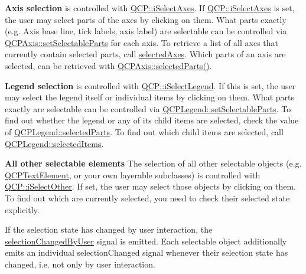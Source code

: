 {\bfseries{Axis selection}} is controlled with \mbox{\hyperlink{namespace_q_c_p_a2ad6bb6281c7c2d593d4277b44c2b037ad6644ac55bef621645326e9dd7469caa}{Q\+C\+P\+::i\+Select\+Axes}}. If \mbox{\hyperlink{namespace_q_c_p_a2ad6bb6281c7c2d593d4277b44c2b037ad6644ac55bef621645326e9dd7469caa}{Q\+C\+P\+::i\+Select\+Axes}} is set, the user may select parts of the axes by clicking on them. What parts exactly (e.\+g. Axis base line, tick labels, axis label) are selectable can be controlled via \mbox{\hyperlink{class_q_c_p_axis_a513f9b9e326c505d9bec54880031b085}{Q\+C\+P\+Axis\+::set\+Selectable\+Parts}} for each axis. To retrieve a list of all axes that currently contain selected parts, call \mbox{\hyperlink{class_q_custom_plot_a7e6b07792b1cb2c31681596582d14dbe}{selected\+Axes}}. Which parts of an axis are selected, can be retrieved with \mbox{\hyperlink{class_q_c_p_axis_a893e8d6cfed9267eb2b793cb1d2b4dce}{Q\+C\+P\+Axis\+::selected\+Parts()}}.

{\bfseries{Legend selection}} is controlled with \mbox{\hyperlink{namespace_q_c_p_a2ad6bb6281c7c2d593d4277b44c2b037a269c9af298e257d1108edec0432b5513}{Q\+C\+P\+::i\+Select\+Legend}}. If this is set, the user may select the legend itself or individual items by clicking on them. What parts exactly are selectable can be controlled via \mbox{\hyperlink{class_q_c_p_legend_a9ce60aa8bbd89f62ae4fa83ac6c60110}{Q\+C\+P\+Legend\+::set\+Selectable\+Parts}}. To find out whether the legend or any of its child items are selected, check the value of \mbox{\hyperlink{class_q_c_p_legend_a3efbf879f6936ec337690985e567dc6f}{Q\+C\+P\+Legend\+::selected\+Parts}}. To find out which child items are selected, call \mbox{\hyperlink{class_q_c_p_legend_ac7d9e567d5c551e09cd9bcc4306c5532}{Q\+C\+P\+Legend\+::selected\+Items}}.

{\bfseries{All other selectable elements}} The selection of all other selectable objects (e.\+g. \mbox{\hyperlink{class_q_c_p_text_element}{Q\+C\+P\+Text\+Element}}, or your own layerable subclasses) is controlled with \mbox{\hyperlink{namespace_q_c_p_a2ad6bb6281c7c2d593d4277b44c2b037af67a50bc26147a13b551b3a625374949}{Q\+C\+P\+::i\+Select\+Other}}. If set, the user may select those objects by clicking on them. To find out which are currently selected, you need to check their selected state explicitly.

If the selection state has changed by user interaction, the \mbox{\hyperlink{class_q_custom_plot_a500c64a109bc773c973ad274f2fa4190}{selection\+Changed\+By\+User}} signal is emitted. Each selectable object additionally emits an individual selection\+Changed signal whenever their selection state has changed, i.\+e. not only by user interaction.

